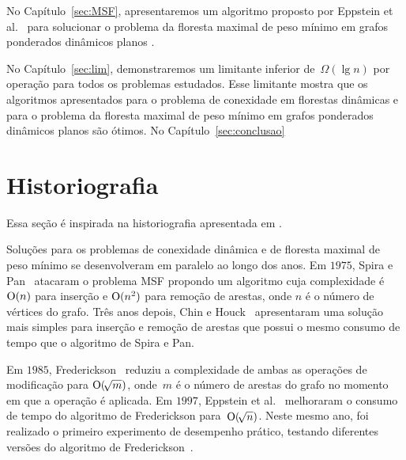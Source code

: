 
No Capítulo~\ref{sec:MSF}, apresentaremos um algoritmo proposto por Eppstein et al.~\cite{EPPSTEIN-planar} para solucionar o problema da floresta maximal de peso mínimo em grafos ponderados dinâmicos planos . 

No Capítulo~\ref{sec:lim}, demonstraremos um limitante inferior de~$\Omega(\lg n)$ por operação para todos os problemas estudados. Esse limitante mostra que os algoritmos apresentados para o problema de conexidade em florestas dinâmicas e para o problema da floresta maximal de peso mínimo em grafos ponderados dinâmicos planos são ótimos.
No Capítulo~\ref{sec:conclusao} 

\section{Historiografia}

Essa seção é inspirada na historiografia apresentada em \cite{QC22, HHSRecentAdvances2022, bruceM}.

Soluções para os problemas de conexidade dinâmica e de floresta maximal de peso mínimo se desenvolveram em paralelo ao longo dos anos. Em $1975$, Spira e Pan~\cite{SP1975} atacaram o problema MSF propondo um algoritmo cuja complexidade é $\mathrm{O}(n)$ para inserção e $\mathrm{O}(n^2)$ para remoção de arestas, onde $n$ é o número de vértices do grafo. Três anos depois, Chin e Houck~\cite{CH1978} apresentaram uma solução mais simples para inserção e remoção de arestas que possui o mesmo consumo de tempo que o algoritmo de Spira e Pan.

Em $1985$, Frederickson~\cite{frederickson1983data} reduziu a complexidade de ambas as operações de modificação para $\mathrm{O}(\!\sqrt{m})$, onde~$m$ é o número de arestas do grafo no momento em que a operação é aplicada.
Em $1997$, Eppstein et al.~\cite{Eppstein1992SparsificationaTF} melhoraram o consumo de tempo do algoritmo de Frederickson para~$\mathrm{O}(\!\sqrt{n})$.
Neste mesmo ano, foi realizado o primeiro experimento de desempenho prático, testando diferentes versões do algoritmo de Frederickson~\cite{xpAnalyGiuseppe}.

